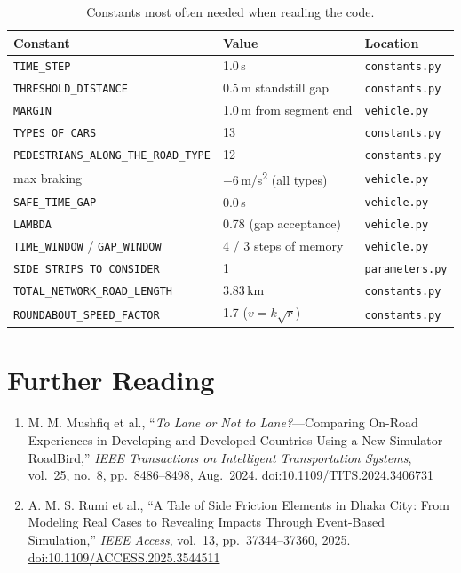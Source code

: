 \documentclass[11pt, a4paper]{article}
\newcommand{\code}[1]{\texttt{#1}}
\begin{document}
\begin{table}[h!]
\centering
\begin{tabular}{l l l}
\toprule
\textbf{Constant} & \textbf{Value} & \textbf{Location} \\
\midrule
\code{TIME\_STEP} & 1.0\,s & \code{constants.py} \\
\code{THRESHOLD\_DISTANCE} & 0.5\,m standstill gap & \code{constants.py} \\
\code{MARGIN} & 1.0\,m from segment end & \code{vehicle.py} \\
\code{TYPES\_OF\_CARS} & 13 & \code{constants.py} \\
\code{PEDESTRIANS\_ALONG\_THE\_ROAD\_TYPE} & 12 & \code{constants.py} \\
max braking & $-6$\,m/s\textsuperscript{2} (all types) & \code{vehicle.py} \\
\code{SAFE\_TIME\_GAP} & 0.0\,s & \code{vehicle.py} \\
\code{LAMBDA} & 0.78 (gap acceptance) & \code{vehicle.py} \\
\code{TIME\_WINDOW} / \code{GAP\_WINDOW} & 4 / 3 steps of memory & \code{vehicle.py} \\
\code{SIDE\_STRIPS\_TO\_CONSIDER} & 1 & \code{parameters.py} \\
\code{TOTAL\_NETWORK\_ROAD\_LENGTH} & 3.83\,km & \code{constants.py} \\
\code{ROUNDABOUT\_SPEED\_FACTOR} & 1.7 ($v = k\sqrt{r}$) & \code{constants.py} \\
\bottomrule
\end{tabular}
\caption{Constants most often needed when reading the code.}
\end{table}

\section*{Further Reading}

\begin{enumerate}
    \item M. M. Mushfiq et al., ``\emph{To Lane or Not to Lane?}---Comparing
    On-Road Experiences in Developing and Developed Countries Using a New
    Simulator RoadBird,'' \emph{IEEE Transactions on Intelligent Transportation
    Systems}, vol.\ 25, no.\ 8, pp.\ 8486--8498, Aug.\ 2024.
    \href{https://ieeexplore.ieee.org/abstract/document/10552416}{doi:10.1109/TITS.2024.3406731}

    \item A. M. S. Rumi et al., ``A Tale of Side Friction Elements in Dhaka City:
    From Modeling Real Cases to Revealing Impacts Through Event-Based
    Simulation,'' \emph{IEEE Access}, vol.\ 13, pp.\ 37344--37360, 2025.
    \href{https://ieeexplore.ieee.org/abstract/document/10898009}{doi:10.1109/ACCESS.2025.3544511}
\end{enumerate}
\end{document}
